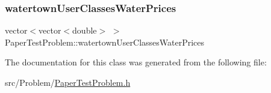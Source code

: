 \subsubsection{\texorpdfstring{watertown\+User\+Classes\+Water\+Prices}{watertownUserClassesWaterPrices}}
{\footnotesize\ttfamily vector$<$vector$<$double$>$ $>$ Paper\+Test\+Problem\+::watertown\+User\+Classes\+Water\+Prices\hspace{0.3cm}{\ttfamily [private]}}



The documentation for this class was generated from the following file\+:\begin{DoxyCompactItemize}
\item 
src/\+Problem/\mbox{\hyperlink{PaperTestProblem_8h}{Paper\+Test\+Problem.\+h}}\end{DoxyCompactItemize}

